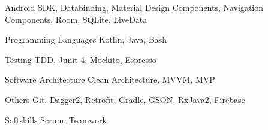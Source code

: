 
\begin{cvskills}

  \cvskill
    {Android} %
    {SDK, Databinding, Material Design Components, Navigation Components, Room, SQLite, LiveData} %

  \cvskill
    {Programming Languages} %
    {Kotlin, Java, Bash} %

  \cvskill
    {Testing} %
    {TDD, Junit 4, Mockito, Espresso} %

  \cvskill
    {Software Architecture} %
    {Clean Architecture, MVVM, MVP} %

  \cvskill
    {Others} %
    {Git, Dagger2, Retrofit, Gradle, GSON, RxJava2, Firebase} %

  \cvskill
    {Softskills} %
    {Scrum, Teamwork} %

\end{cvskills}